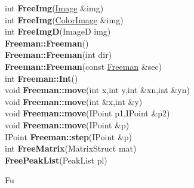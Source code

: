 \documentclass[10pt,titlepage]{article}
\def\functionlistentry#1#2#3#4#5#6{\noindent #1 {\bf #2}(#3) \dotfill #6\\}
\def\letterref#1{}
\def\letterlabel#1{\vspace{0.5cm}\centerline{\Large #1}}
\def\letterlabelend#1{}
\begin{document}
{{\letterref{Fe}
\letterref{Fi}
\letterref{Fm}
\letterref{Fo}
\letterref{Fr}
\letterref{Fu}
\letterlabelend{Fr}
\functionlistentry{int}{FreeImg}{\hyperlink{Image}{Image} \&img}{12}{Images}{}
\functionlistentry{int}{FreeImg}{\hyperlink{ColorImage}{ColorImage} \&img}{24}{Images}{}
\functionlistentry{int}{FreeImgD}{ImageD img}{87}{Images}{}
\functionlistentry{}{Freeman::Freeman}{}{464}{conturs}{}
\functionlistentry{}{Freeman::Freeman}{int dir}{465}{conturs}{}
\functionlistentry{}{Freeman::Freeman}{const \hyperlink{Freeman}{Freeman} \&sec}{466}{conturs}{}
\functionlistentry{int}{Freeman::Int}{}{467}{conturs}{}
\functionlistentry{void}{Freeman::move}{int x,int y,int \&xn,int \&yn}{468}{conturs}{}
\functionlistentry{void}{Freeman::move}{int \&x,int \&y}{469}{conturs}{}
\functionlistentry{void}{Freeman::move}{IPoint p1,IPoint \&p2}{470}{conturs}{}
\functionlistentry{void}{Freeman::move}{IPoint \&p}{471}{conturs}{}
\functionlistentry{IPoint}{Freeman::step}{IPoint \&p}{472}{conturs}{}
\functionlistentry{int}{FreeMatrix}{MatrixStruct mat}{1576}{obsolet}{}
\functionlistentry{}{FreePeakList}{PeakList pl}{1260}{registration}{}

\letterlabel{Fu}
\letterref{A}
\letterref{B}
\letterref{C}
\letterref{D}
\letterref{E}
\letterref{F}
\letterref{G}
\letterref{H}
\letterref{I}
\letterref{K}
\letterref{L}
\letterref{M}
\letterref{N}
\letterref{O}
\letterref{P}
\letterref{Q}
\letterref{R}
\letterref{S}
\letterref{T}
\letterref{U}
\letterref{V}
\letterref{W}
\letterref{X}
\letterref{Y}
\letterref{Z}

}}
\end{document}
